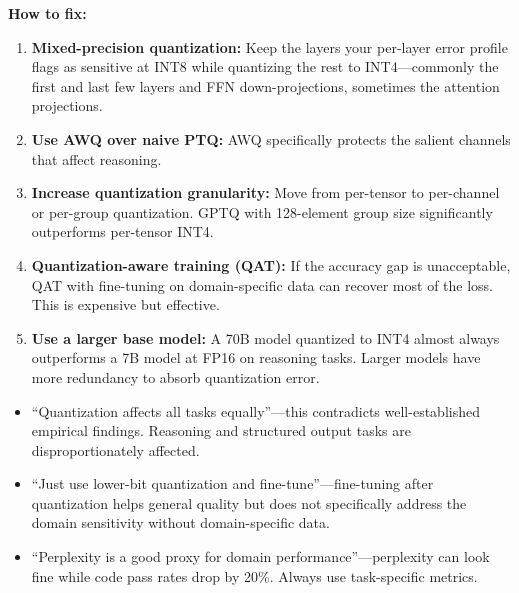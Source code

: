 \begin{interviewq}
\textbf{How to fix:}
\begin{enumerate}
    \item \textbf{Mixed-precision quantization:} Keep the layers your per-layer error profile flags as sensitive at INT8 while quantizing the rest to INT4---commonly the first and last few layers and FFN down-projections, sometimes the attention projections.
    \item \textbf{Use AWQ over naive PTQ:} AWQ specifically protects the salient channels that affect reasoning.
    \item \textbf{Increase quantization granularity:} Move from per-tensor to per-channel or per-group quantization. GPTQ with 128-element group size significantly outperforms per-tensor INT4.
    \item \textbf{Quantization-aware training (QAT):} If the accuracy gap is unacceptable, QAT with fine-tuning on domain-specific data can recover most of the loss. This is expensive but effective.
    \item \textbf{Use a larger base model:} A 70B model quantized to INT4 almost always outperforms a 7B model at FP16 on reasoning tasks. Larger models have more redundancy to absorb quantization error.
\end{enumerate}

\redflags
\begin{itemize}
    \item ``Quantization affects all tasks equally''---this contradicts well-established empirical findings. Reasoning and structured output tasks are disproportionately affected.
    \item ``Just use lower-bit quantization and fine-tune''---fine-tuning after quantization helps general quality but does not specifically address the domain sensitivity without domain-specific data.
    \item ``Perplexity is a good proxy for domain performance''---perplexity can look fine while code pass rates drop by 20\%. Always use task-specific metrics.
\end{itemize}



\end{interviewq}
